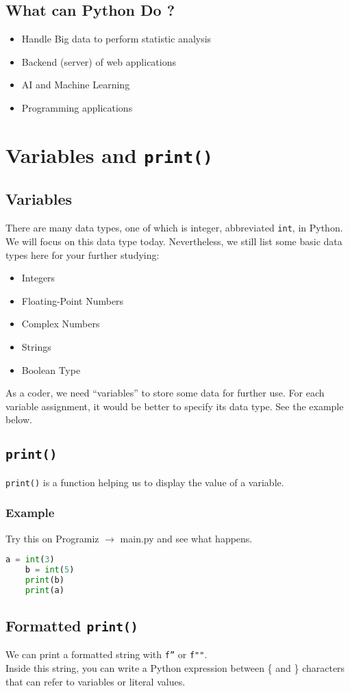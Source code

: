 \documentclass[12pt]{article}
\begin{document}
\begin{CJK*}{UTF8}{bkai}
\subsection{What can Python Do ?}
\begin{itemize}
    \item Handle Big data to perform statistic analysis
    \item Backend (server) of web applications
    \item AI and Machine Learning
    \item Programming applications
\end{itemize}

\section{Variables and \texttt{print()}}
\subsection{Variables}
There are many data types, one of which is integer, abbreviated \texttt{int}, in Python. We will focus on this data type today. Nevertheless, we still list some basic data types here for your further studying:
\begin{itemize}
    \item Integers
    \item Floating-Point Numbers
    \item Complex Numbers
    \item Strings
    \item Boolean Type
\end{itemize}
As a coder, we need ``variables'' to store some data for further use. For each variable assignment, it would be better to specify its data type. See the example below.
\subsection{\texttt{print()}}
\texttt{print()} is a function helping us to display the value of a variable.
\subsubsection{Example}
Try this on Programiz $\rightarrow$ main.py and see what happens.
\begin{lstlisting}[language = python]
    a = int(3)
    b = int(5)
    print(b)
    print(a)
\end{lstlisting}
\subsection{Formatted \texttt{print()}}
We can print a formatted string with \texttt{f''} or \texttt{f""}. \\
Inside this string, you can write a Python expression between \{ and \}
characters that can refer to variables or literal values. 

\end{CJK*}
\end{document}
